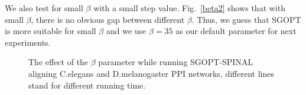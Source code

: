 \documentclass{bioinfo}
\theoremstyle{definition}
\begin{document}
We also test for small $\beta$ with a small step value. Fig.~\ref{beta2} shows that with small $\beta$, there is no obvious gap between different $\beta$. Thus, we guess that SGOPT is more suitable for small $\beta$ and we use $\beta=35$ as our default parameter for next experiments.

\begin{figure}[!htbp]
    \caption{The effect of the $\beta$ parameter while running SGOPT-SPINAL aligning C.elegans and D.melanogaster PPI networks, different lines stand for different running time. }
    \label{beta}
\end{figure}
\end{document}
